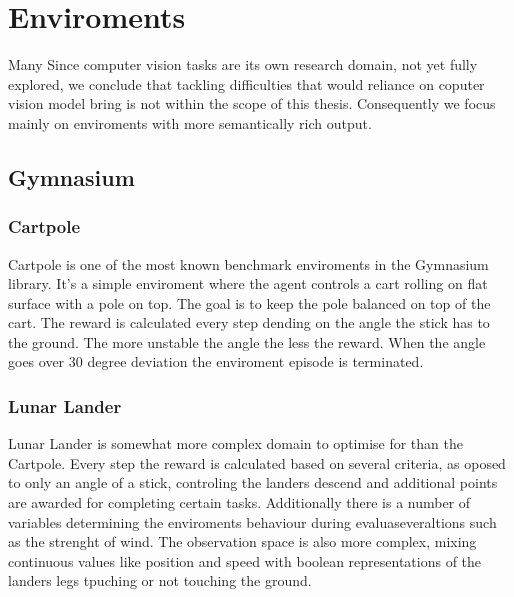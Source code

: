 \chapter{Enviroments}
Many 
Since computer vision tasks are its own research domain, not yet fully explored, we conclude that tackling 
difficulties that would reliance on coputer vision model bring is not within the scope of this thesis. 
Consequently we focus mainly on enviroments with more semantically rich output.
\section{Gymnasium}

\subsection{Cartpole}
Cartpole is one of the most known benchmark enviroments in the Gymnasium library. It's a simple enviroment where the agent controls a cart rolling on flat surface with a pole on top.
The goal is to keep the pole balanced on top of the cart. The reward is calculated every step dending on the angle the stick has to the ground. The more unstable the angle the less the reward. 
When the angle goes over 30 degree deviation the enviroment episode is terminated.
\subsection{Lunar Lander}
Lunar Lander is somewhat more complex domain to optimise for than the Cartpole.  
Every step the reward is calculated based on several criteria, as oposed to only an angle of a stick, controling the landers descend and additional points are awarded for completing certain tasks.
Additionally there is a number of variables determining the enviroments behaviour during evaluaseveraltions such as the strenght of wind.
The observation space is also more complex, mixing continuous values like position and speed with boolean representations of the landers legs tpuching or not touching the ground.
